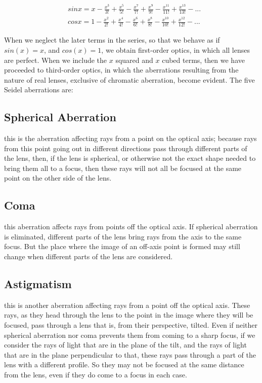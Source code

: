 \documentclass[../main.tex]{subfiles}
\begin{document}
	\begin{align}
		&sinx=x-\frac{x^3}{3!}+\frac{x^5}{5!}-\frac{x^7}{7!}+\frac{x^9}{9!}-\frac{x^11}{11!}+\frac{x^13}{13!}-...\\
		&cosx=1-\frac{x^2}{2!}+\frac{x^4}{4!}-\frac{x^6}{6!}+\frac{x^8}{8!}-\frac{x^10}{10!}+\frac{x^12}{12!}-...
	\end{align}

	When we neglect the later terms in the series, so that we behave as if $sin(x) = x$, and $cos(x) = 1$, we obtain first-order optics, in which all lenses are perfect. When we include the $x$ squared and $x$ cubed terms, then we have proceeded to third-order optics, in which the aberrations resulting from the nature of real lenses, exclusive of chromatic aberration, become evident.
	The five Seidel aberrations are:
	\subsection{Spherical Aberration}
	this is the aberration affecting rays from a point on the optical axis; because rays from this point going out in different directions pass through different parts of the lens, then, if the lens is spherical, or otherwise not the exact shape needed to bring them all to a focus, then these rays will not all be focused at the same point on the other side of the lens.
	\subsection{Coma}
	this aberration affects rays from points off the optical axis. If spherical aberration is eliminated, different parts of the lens bring rays from the axis to the same focus. But the place where the image of an off-axis point is formed may still change when different parts of the lens are considered.
	\subsection{Astigmatism}
	this is another aberration affecting rays from a point off the optical axis. These rays, as they head through the lens to the point in the image where they will be focused, pass through a lens that is, from their perspective, tilted. Even if neither spherical aberration nor coma prevents them from coming to a sharp focus, if we consider the rays of light that are in the plane of the tilt, and the rays of light that are in the plane perpendicular to that, these rays pass through a part of the lens with a different profile. So they may not be focused at the same distance from the lens, even if they do come to a focus in each case.
\end{document}
